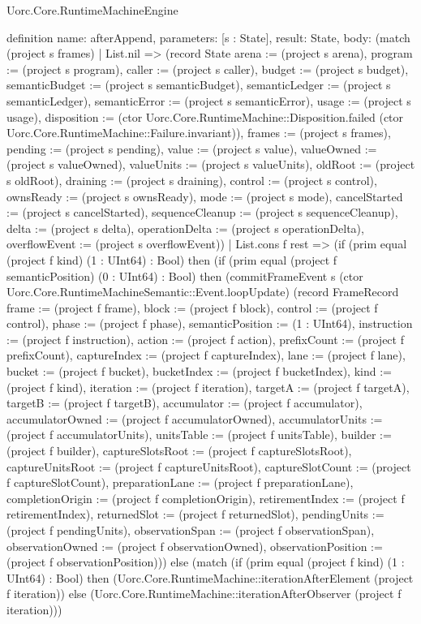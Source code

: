 \begin{lexlean}{Uorc.Core.RuntimeMachineEngine}
\begin{semanticmodule}
definition{
  name: afterAppend,
  parameters: [s : State],
  result: State,
  body: (match (project s frames)
    | List.nil => (record State {arena := (project s arena), program := (project s program), caller := (project s caller), budget := (project s budget), semanticBudget := (project s semanticBudget), semanticLedger := (project s semanticLedger), semanticError := (project s semanticError), usage := (project s usage), disposition := (ctor Uorc.Core.RuntimeMachine::Disposition.failed (ctor Uorc.Core.RuntimeMachine::Failure.invariant)), frames := (project s frames), pending := (project s pending), value := (project s value), valueOwned := (project s valueOwned), valueUnits := (project s valueUnits), oldRoot := (project s oldRoot), draining := (project s draining), control := (project s control), ownsReady := (project s ownsReady), mode := (project s mode), cancelStarted := (project s cancelStarted), sequenceCleanup := (project s sequenceCleanup), delta := (project s delta), operationDelta := (project s operationDelta), overflowEvent := (project s overflowEvent)})
    | List.cons f rest => (if (prim equal (project f kind) (1 : UInt64) : Bool) then (if (prim equal (project f semanticPosition) (0 : UInt64) : Bool) then (commitFrameEvent s (ctor Uorc.Core.RuntimeMachineSemantic::Event.loopUpdate) (record FrameRecord {frame := (project f frame), block := (project f block), control := (project f control), phase := (project f phase), semanticPosition := (1 : UInt64), instruction := (project f instruction), action := (project f action), prefixCount := (project f prefixCount), captureIndex := (project f captureIndex), lane := (project f lane), bucket := (project f bucket), bucketIndex := (project f bucketIndex), kind := (project f kind), iteration := (project f iteration), targetA := (project f targetA), targetB := (project f targetB), accumulator := (project f accumulator), accumulatorOwned := (project f accumulatorOwned), accumulatorUnits := (project f accumulatorUnits), unitsTable := (project f unitsTable), builder := (project f builder), captureSlotsRoot := (project f captureSlotsRoot), captureUnitsRoot := (project f captureUnitsRoot), captureSlotCount := (project f captureSlotCount), preparationLane := (project f preparationLane), completionOrigin := (project f completionOrigin), retirementIndex := (project f retirementIndex), returnedSlot := (project f returnedSlot), pendingUnits := (project f pendingUnits), observationSpan := (project f observationSpan), observationOwned := (project f observationOwned), observationPosition := (project f observationPosition)})) else (match (if (prim equal (project f kind) (1 : UInt64) : Bool) then (Uorc.Core.RuntimeMachine::iterationAfterElement (project f iteration)) else (Uorc.Core.RuntimeMachine::iterationAfterObserver (project f iteration)))
}
\end{semanticmodule}
\end{lexlean}
